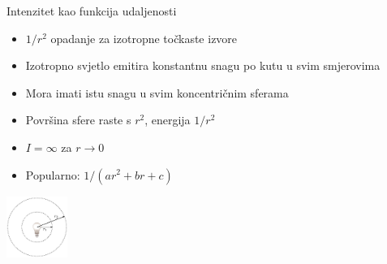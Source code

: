 \documentclass[9pt]{beamer}
\begin{document}
\begin{frame}{Intenzitet kao funkcija udaljenosti}
	\begin{itemize}
		\item $1/r^2$ opadanje za izotropne točkaste izvore
		\item Izotropno svjetlo emitira konstantnu snagu po kutu u svim smjerovima
		\item Mora imati istu snagu u svim koncentričnim sferama
		\item Površina sfere raste s $r^2$, energija $1/r^2$
		\item $I=\infty$ za $r\rightarrow 0$
		\item Popularno: $1/(ar^2 + br +c)$
	\end{itemize}
	\begin{center}
	\includegraphics[height=2cm]{slike/slide_027_cropped.jpg}
\end{center}
\end{frame}
\end{document}
